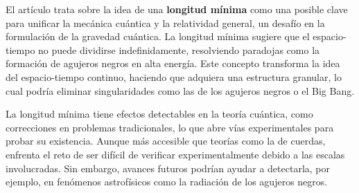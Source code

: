 El artículo trata sobre la idea de una \textbf{longitud mínima} como una posible clave para unificar la mecánica cuántica y la relatividad general, un desafío en la formulación de la gravedad cuántica. La longitud mínima sugiere que el espacio-tiempo no puede dividirse indefinidamente, resolviendo paradojas como la formación de agujeros negros en alta energía. Este concepto transforma la idea del espacio-tiempo continuo, haciendo que adquiera una estructura granular, lo cual podría eliminar singularidades como las de los agujeros negros o el Big Bang.

La longitud mínima tiene efectos detectables en la teoría cuántica, como correcciones en problemas tradicionales, lo que abre vías experimentales para probar su existencia. Aunque más accesible que teorías como la de cuerdas, enfrenta el reto de ser difícil de verificar experimentalmente debido a las escalas involucradas. Sin embargo, avances futuros podrían ayudar a detectarla, por ejemplo, en fenómenos astrofísicos como la radiación de los agujeros negros.